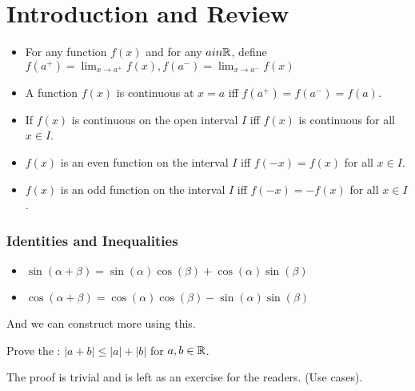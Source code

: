 \documentclass[class=article,crop=false]{standalone}
\begin{document}
\section{Introduction and Review}
\begin{itemize}
	\item For any function $f(x)$ and for any $a in \mathbb{R}$, define $ f(a^{+})= \lim_{ x \to a^{+}} f(x),  f(a^{-}) =\lim_{ x \to a^{-}}f(x)  $
		\item A function $f(x)$ is continuous at  $x=a$ iff  $f(a^{+})=f(a^{-})=f(a)$.
	\item If $f(x)$ is continuous on the open interval  $I$ iff  $f(x)$ is continuous for all  $x \in I$.
	\item  $f(x)$ is an even function on the interval  $I$ iff  $f(-x)=f(x)$ for all  $x \in I$.
	\item $f(x)$ is an odd function on the interval  $I$ iff  $f(-x)=-f(x)$ for all  $x \in I$.
\end{itemize}

\subsubsection{Identities and Inequalities}
\begin{itemize}
	\item $\sin(\alpha+\beta)=\sin(\alpha)\cos(\beta)+\cos(\alpha)\sin(\beta)$
	\item $\cos(\alpha+\beta) = \cos(\alpha)\cos(\beta)-\sin(\alpha)\sin(\beta)$
\end{itemize}
And we can construct more using this.

\begin{eg}[1]
Prove the : $|a+b|\leq |a|+|b|$ for $a,b \in \mathbb{R}$.
\end{eg}

\begin{prf}
	The proof is trivial and is left as an exercise for the readers. (Use cases).
\end{prf}
\end{document}
